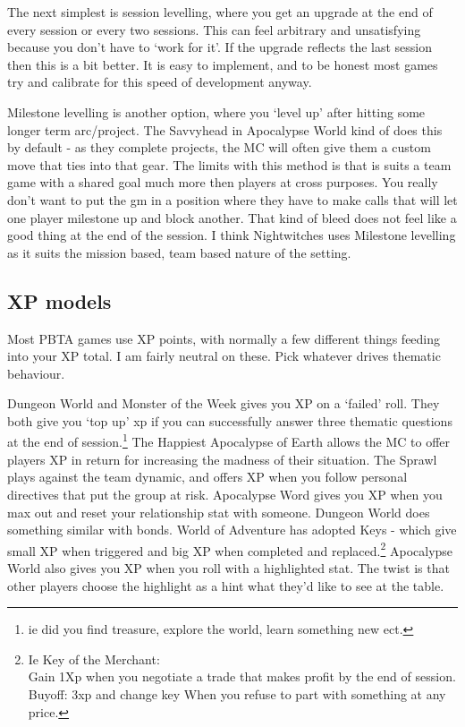 \documentclass{tufte-handout}
\begin{document}
The next simplest is session levelling, where you get an upgrade at the end of every session or every two sessions. This can feel arbitrary and unsatisfying because you don't have to `work for it'. If the upgrade reflects the last session then this is a bit better. It is easy to implement, and to be honest most games try and calibrate for this speed of development anyway. 

Milestone levelling is another option, where you `level up' after hitting some longer term arc/project. The Savvyhead in Apocalypse World kind of does this by default - as they complete projects, the MC will often give them a custom move that ties into that gear. The limits with this method is that is suits a team game with a shared goal much more then players at cross purposes. You really don't want to put the gm in a position where they have to make calls that will let one player milestone up and block another. That kind of bleed does not feel like a good thing at the end of the session.  I think Nightwitches uses Milestone levelling as it suits the mission based, team based nature of the setting.

\subsection{XP models}
Most PBTA games use XP points, with normally a few different things feeding into your XP total. I am fairly neutral on these. Pick whatever drives thematic behaviour.

Dungeon World and Monster of the Week gives you XP on a `failed' roll.
They both give you `top up' xp if you can successfully answer three thematic questions at the end of session.\footnote{ie did you find treasure, explore the world, learn something new ect.}
The Happiest Apocalypse of Earth allows the MC to offer players XP in return for increasing the madness of their situation.
The Sprawl plays against the team dynamic, and offers XP when you follow personal directives that put the group at risk.
Apocalypse Word gives you XP when you max out and reset your relationship stat with someone. Dungeon World does something similar with bonds. 
World of Adventure has adopted Keys - which give small XP when triggered and big XP when completed and replaced.\footnote{Ie Key of the Merchant: \\ Gain 1Xp when you negotiate a trade that makes profit by the end of session. \\ Buyoff: 3xp and change key When you refuse to part with something at any price.}
Apocalypse World also gives you XP when you roll with a highlighted stat. The twist is that other players choose the highlight as a hint what they'd like to see at the table. 
\end{document}
